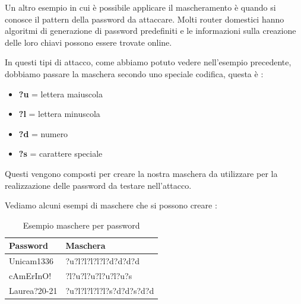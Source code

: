 Un altro esempio in cui è possibile applicare il mascheramento è quando si conosce il pattern della password da attaccare. Molti router domestici hanno algoritmi di generazione di password predefiniti e le informazioni sulla creazione delle loro chiavi possono essere trovate online.

In questi tipi di attacco, come abbiamo potuto vedere nell'esempio precedente, dobbiamo passare la maschera secondo uno speciale codifica, questa è :

\begin{itemize}
    \item \textbf{?u} = lettera maiuscola
    \item \textbf{?l} = lettera minuscola
    \item \textbf{?d} = numero
    \item \textbf{?s} = carattere speciale
\end{itemize}

Questi vengono composti per creare la nostra maschera da utilizzare per la realizzazione delle password da testare nell'attacco.

Vediamo alcuni esempi di maschere che si possono creare :

\begin{table}[htbp]
    \begin{center}

    \begin{tabular}{|l|l|}
        \hline
        \textbf{Password} & \textbf{Maschera} \\
        \hline
        Unicam1336 & ?u?l?l?l?l?l?d?d?d?d \\
        \hline
        cAmErInO! & ?l?u?l?u?l?u?l?u?s \\
        \hline
        Laurea?20-21 & ?u?l?l?l?l?l?s?d?d?s?d?d \\
        \hline
    \end{tabular}
\end{center}
\caption{Esempio maschere per password}
\end{table}